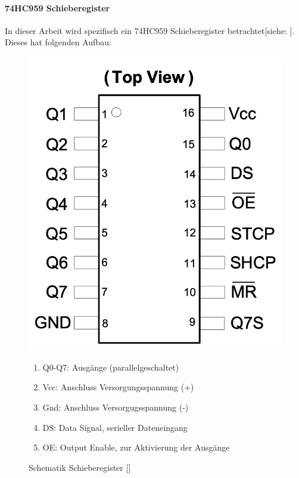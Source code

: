 \paragraph{74HC959 Schieberegister}
In dieser Arbeit wird spezifisch ein 74HC959 Schieberegister betrachtet[siehe: \cite*[siehe ][]{DatasheetSchieberegister74HC595}].
Dieses hat folgenden Aufbau:
\begin{figure}[htbp]
\begin{minipage}{0.45\textwidth}
		\includegraphics [width=1\textwidth] {img/Schieberegister}
		\caption{Schematik Schieberegister [\cite*[siehe ][]{DatasheetSchieberegister74HC595}]}
		\label{img:Shift}
\end{minipage}
\begin{minipage}{0.55\textwidth}
	\begin{enumerate}
		\item Q0-Q7: Ausgänge (parallelgeschaltet)
		\item Vcc: Anschluss Versorgungsspannung (+)
		\item Gnd: Anschluss Versorgugsspannung (-)
		\item DS: Data Signal, serieller Dateneingang
		\item OE: Output Enable, zur Aktivierung der Ausgänge

\end{enumerate}
\end{minipage}
\end{figure}
